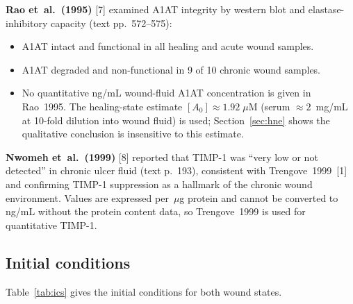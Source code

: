 \documentclass[10pt,a4paper]{article}
\numberwithin{equation}{section}
\newcommand{\cit}[1]{[#1]}   %
\begin{document}
\textbf{Rao et~al.\ (1995)} \cit{7} examined A1AT integrity by western blot and
elastase-inhibitory capacity (text pp.~572--575):

\begin{itemize}[noitemsep]
  \item A1AT intact and functional in all healing and acute wound samples.
  \item A1AT degraded and non-functional in 9 of 10 chronic wound samples.
  \item No quantitative ng/mL wound-fluid A1AT concentration is given in Rao~1995.
    The healing-state estimate $[A_0] \approx 1.92\;\mu\text{M}$ (serum
    $\approx 2$~mg/mL at 10-fold dilution into wound fluid) is used; Section~\ref{sec:hne}
    shows the qualitative conclusion is insensitive to this estimate.
\end{itemize}

\textbf{Nwomeh et~al.\ (1999)} \cit{8} reported that TIMP-1 was ``very low or not
detected'' in chronic ulcer fluid (text p.~193), consistent with Trengove~1999~\cit{1}
and confirming TIMP-1 suppression as a hallmark of the chronic wound environment.
Values are expressed per~$\mu$g protein and cannot be converted to ng/mL without the
protein content data, so Trengove~1999 is used for quantitative TIMP-1.

\subsection{Initial conditions}

Table~\ref{tab:ics} gives the initial conditions for both wound states.
\end{document}
